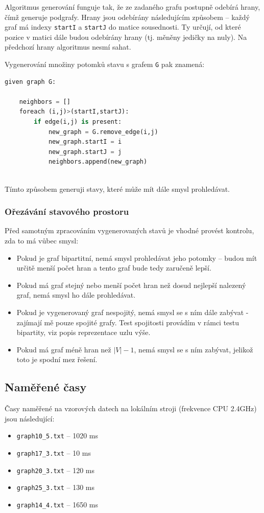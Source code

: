\documentclass[czech]{article}
\begin{document}
Algoritmus generování funguje tak, že ze zadaného grafu postupně odebírá hrany, čímž generuje podgrafy. Hrany jsou odebírány následujícím způsobem -- každý graf má indexy \texttt{startI} a \texttt{startJ} do matice sousednosti. Ty určují, od které pozice v matici dále budou odebírány hrany (tj. měněny jedičky na nuly). Na předchozí hrany algoritmus nesmí sahat.

Vygenerování množiny potomků stavu s grafem \texttt{G} pak znamená:
\begin{lstlisting}[tabsize=2,language=python]
	given graph G:
	
	neighbors = []
	foreach (i,j)>(startI,startJ):
		if edge(i,j) is present:
			new_graph = G.remove_edge(i,j)
			new_graph.startI = i
			new_graph.startJ = j
			neighbors.append(new_graph)
			
\end{lstlisting}
Tímto způsobem generuji stavy, které může mít dále smysl prohledávat.


\subsubsection{Ořezávání stavového prostoru}
Před samotným zpracováním vygenerovaných stavů je vhodné provést kontrolu, zda to má vůbec smysl:
\begin{itemize}
	\item Pokud je graf bipartitní, nemá smysl prohledávat jeho potomky -- budou mít určitě menší počet hran a tento graf bude tedy zaručeně lepší.
	\item Pokud má graf stejný nebo menší počet hran než dosud nejlepší nalezený graf, nemá smysl ho dále prohledávat.
	\item Pokud je vygenerovaný graf nespojitý, nemá smysl se s ním dále zabývat - zajímají mě pouze spojité grafy. Test spojitosti provádím v rámci testu bipartity, viz popis reprezentace uzlu výše.
	\item Pokud má graf méně hran než $|V|-1$, nemá smysl se s ním zabývat, jelikož toto je spodní mez řešení.
\end{itemize}

\subsection{Naměřené časy}
Časy naměřené na vzorových datech na lokálním stroji (frekvence CPU 2.4GHz) jsou následující:

\begin{itemize}
	\item \texttt{graph10\_5.txt} -- 1020 ms
	\item \texttt{graph17\_3.txt} -- 10 ms
	\item \texttt{graph20\_3.txt} -- 120 ms
	\item \texttt{graph25\_3.txt} -- 130 ms
	\item \texttt{graph14\_4.txt} -- 1650 ms
\end{itemize}
\end{document}
